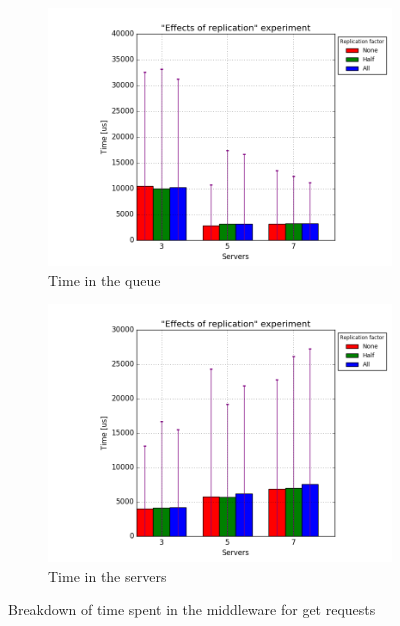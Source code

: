 \documentclass[11pt]{article}
\begin{document}


\begin{figure}
\centering
\begin{subfigure}{.5\textwidth}
	\centering
	\includegraphics[width=\linewidth]{plots/replication-get-queue}
	\caption{Time in the queue}
	\label{fig:replication-get-queue}
\end{subfigure}%
\begin{subfigure}{.5\textwidth}
	\centering
	\includegraphics[width=\linewidth]{plots/replication-get-servers}
	\caption{Time in the servers}
	\label{fig:replication-get-servers}
\end{subfigure}
\caption{Breakdown of time spent in the middleware for get requests}
\label{fig:replication-get-breakdown}
\end{figure}
\end{document}
